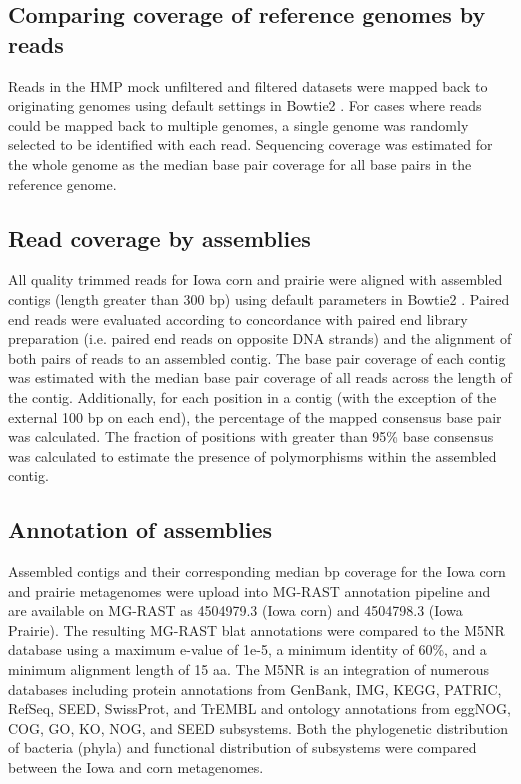 \documentclass[11pt]{article} %
\begin{document}
\subsection{Comparing coverage of reference genomes by reads}
Reads in the HMP mock unfiltered and filtered datasets were mapped
back to originating genomes using default settings in Bowtie2
\cite{bowtie}.  For cases where reads could be mapped back to multiple
genomes, a single genome was randomly selected to be identified with
each read.  Sequencing coverage was estimated for the whole genome as
the median base pair coverage for all base pairs in the reference
genome.

\subsection{Read coverage by assemblies}
All quality trimmed reads for Iowa corn and prairie were aligned with
assembled contigs (length greater than 300 bp) using default
parameters in Bowtie2 \cite{bowtie}.  Paired end reads were evaluated according to
concordance with paired end library preparation (i.e. paired end reads
on opposite DNA strands) and the alignment of both pairs of reads to
an assembled contig.  The base pair coverage of each contig was
estimated with the median base pair coverage of all reads across the
length of the contig.  Additionally, for each position in a contig
(with the exception of the external 100 bp on each end), the
percentage of the mapped consensus base pair was calculated.  The
fraction of positions with greater than 95\% base consensus was
calculated to estimate the presence of polymorphisms within the
assembled contig.

\subsection {Annotation of assemblies}
Assembled contigs and their corresponding median bp coverage for the
Iowa corn and prairie metagenomes were upload into MG-RAST annotation
pipeline \cite{Meyer:2008db} and are available on MG-RAST as 4504979.3 (Iowa corn)
and 4504798.3 (Iowa Prairie).  The resulting MG-RAST blat annotations
were compared to the M5NR database using a maximum e-value of 1e-5, a
minimum identity of 60\%, and a minimum alignment length of 15 aa.  The M5NR is an 
integration of numerous databases including protein annotations from GenBank, IMG, 
KEGG, PATRIC, RefSeq, SEED, SwissProt, and TrEMBL and ontology annotations from 
eggNOG, COG, GO, KO, NOG, and SEED subsystems. Both the phylogenetic 
distribution of bacteria (phyla) and functional
distribution of subsystems were compared between the Iowa and corn
metagenomes.
  
\end{document}
